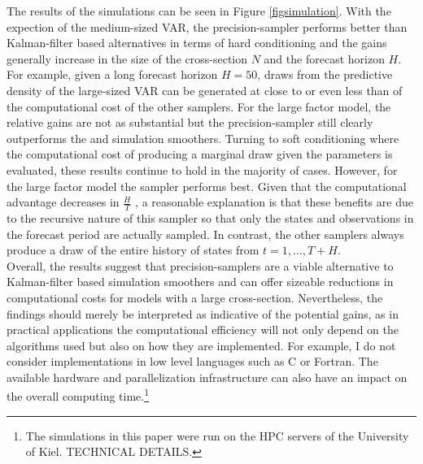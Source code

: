 \documentclass[notitlepage,a4paper,12pt]{article}
\begin{document}
The results of the simulations can be seen in Figure \ref{figsimulation}. With the expection of the medium-sized VAR, the precision-sampler performs better than Kalman-filter based alternatives in terms of hard conditioning and the gains generally increase in the size of the cross-section $N$ and the forecast horizon $H$. For example, given a long forecast horizon $H=50$, draws from the predictive density of the large-sized VAR can be generated at close to or even less than  of the computational cost of the other samplers. For the large factor model, the relative gains are not as substantial but the precision-sampler still clearly outperforms the \citet{carterkohn1994_biomtr} and \citet{durbinkoopman2002_biomtr} simulation smoothers. Turning to soft conditioning where the computational cost of producing a marginal draw given the parameters is evaluated, these results continue to hold in the majority of cases. However, for the large factor model the \citet{carterkohn1994_biomtr} sampler performs best. Given that the computational advantage decreases in $\frac{H}{T}$ , a reasonable explanation is that these benefits are due to the recursive nature of this sampler so that only the states and observations in the forecast period are actually sampled. In contrast, the other samplers always produce a draw of the entire history of states from $t=1, \dots, T+H$.\\

Overall, the results suggest that precision-samplers are a viable alternative to Kalman-filter based simulation smoothers and can offer sizeable reductions in computational costs for models with a large cross-section. Nevertheless, the findings should merely be interpreted as indicative of the potential gains, as in practical applications the computational efficiency will not only depend on the algorithms used but also on how they are implemented. For example, I do not consider implementations in low level languages such as C or Fortran. The available hardware and parallelization infrastructure can also have an impact on the overall computing time.\footnote{The simulations in this paper were run on the HPC servers of the University of Kiel. TECHNICAL DETAILS.}
\end{document}
